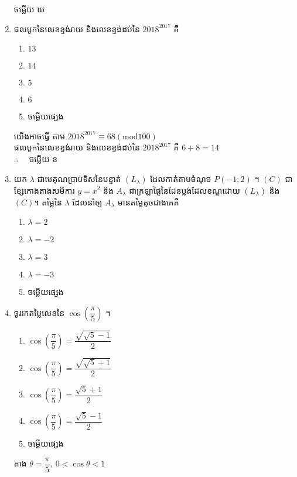 \documentclass[a4paper,12pt]{article}
\begin{document}
\begin{enumerate}[m]
\begin{center}
		\kml ចម្លើយ \kbk ឃ
	\end{center}
	{\color{blue}\hrulefill}
	\item ផលបូកនៃលេខខ្ទង់រាយ និងលេខខ្ទង់ដប់នៃ $2018^{2017}$ គឺ
	\begin{enumerate}[k,5]
		\item $13$
		\item $14$
		\item $5$
		\item $6$
		\item ចម្លើយផ្សេង
	\end{enumerate}
	\answer
	\begin{center}
		យើងអាចធ្វើ តាម $2018^{2017}\equiv68 \left(\mathrm{mod}100\right)$\\
		ផលបូកនៃលេខខ្ទង់រាយ និងលេខខ្ទង់ដប់នៃ $2018^{2017}$ គឺ $6+8=14$\\
		$\therefore \quad$ \kml ចម្លើយ \kbk ខ
	\end{center}
	{\color{blue}\hrulefill}
	\item យក $\lambda$ ជាមេគុណប្រាប់ទិសនៃបន្ទាត់ $\left(L_\lambda\right)$ ដែលកាត់តាមចំណុច $P\left(-1;2\right)$ ។ $\left(C\right)$ ជាខ្សែកោងតាងសមីការ $y=x^2$ និង $A_\lambda$ ជាក្រឡាផ្ទៃនៃដែនប្លង់ដែលខណ្ឌដោយ $\left(L_\lambda\right)$ និង $\left(C\right)$។ តម្លៃនៃ $\lambda$ ដែលនាំឲ្យ $A_\lambda$ មានតម្លៃតូចជាងគេគឺ
	\begin{enumerate}[k,5]
		\item $\lambda=2$
		\item $\lambda=-2$
		\item $\lambda=3$
		\item $\lambda=-3$
		\item ចម្លើយផ្សេង
	\end{enumerate}
	\answer
	{\color{blue}\hrulefill}
	\item ចូររកតម្លៃលេខនៃ $\cos\left(\dfrac{\pi}{5}\right)$ ។
	\begin{enumerate}[k,3]
		\item $\cos\left(\dfrac{\pi}{5}\right)=\dfrac{\sqrt{\sqrt{5}-1}}{2}$
		\item $\cos\left(\dfrac{\pi}{5}\right)=\dfrac{\sqrt{\sqrt{5}+1}}{2}$
		\item $\cos\left(\dfrac{\pi}{5}\right)=\dfrac{\sqrt{5}+1}{2}$
		\item $\cos\left(\dfrac{\pi}{5}\right)=\dfrac{\sqrt{5}-1}{2}$
		\item ចម្លើយផ្សេង
	\end{enumerate}
	\answer
	\begin{center}
		តាង $\theta=\dfrac{\pi}{5},~0<\cos\theta<1$

\end{center}
\end{enumerate}
\end{document}
